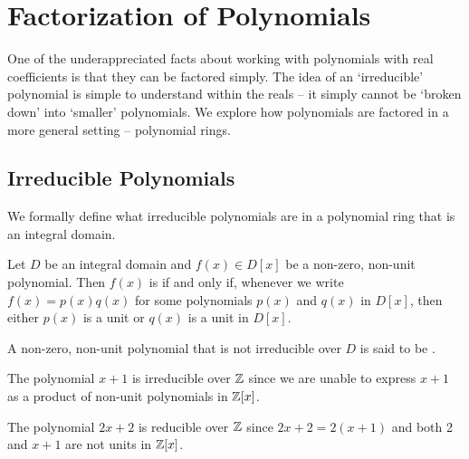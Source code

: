 \chapter{Factorization of Polynomials}
One of the underappreciated facts about working with polynomials with real coefficients is that they can be factored simply. The idea of an `irreducible' polynomial is simple to understand within the reals -- it simply cannot be `broken down' into `smaller' polynomials. We explore how polynomials are factored in a more general setting -- polynomial rings.

\section{Irreducible Polynomials}
We formally define what irreducible polynomials are in a polynomial ring that is an integral domain.
\begin{definition}
    Let $D$ be an integral domain and $f(x) \in D[x]$ be a non-zero, non-unit polynomial. Then $f(x)$ is  if and only if, whenever we write $f(x) = p(x)q(x)$ for some polynomials $p(x)$ and $q(x)$ in $D[x]$, then either $p(x)$ is a unit or $q(x)$ is a unit in $D[x]$.

    A non-zero, non-unit polynomial that is not irreducible over $D$ is said to be .
\end{definition}

\begin{example}
    The polynomial $x + 1$ is irreducible over $\mathbb{Z}$ since we are unable to express $x+1$ as a product of non-unit polynomials in $\mathbb{Z}[x]$.
\end{example}

\begin{example}
    The polynomial $2x + 2$ is reducible over $\mathbb{Z}$ since $2x+2 = 2(x+1)$ and both 2 and $x+1$ are not units in $\mathbb{Z}[x]$.
\end{example}

